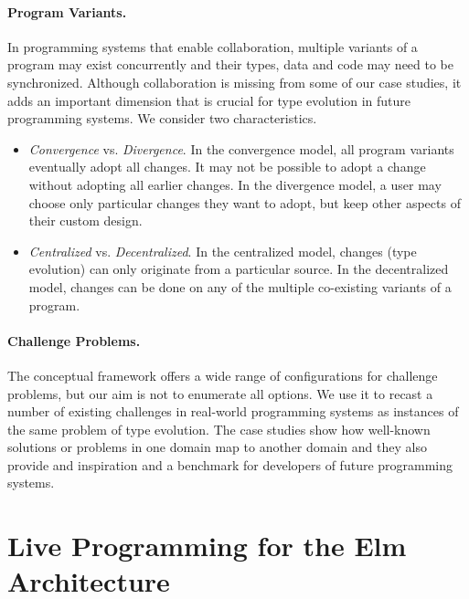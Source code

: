 \documentclass[english,submission]{programming}
\begin{document}
\paragraph{Program Variants.}
In programming systems that enable collaboration, multiple variants of a program may exist
concurrently and their types, data and code may need to be synchronized. Although collaboration
is missing from some of our case studies, it adds an important dimension that is crucial for
type evolution in future programming systems. We consider two characteristics.

\begin{itemize}
\item \emph{Convergence} vs. \emph{Divergence}. In the convergence model, all program variants
  eventually adopt all changes. It may not be possible to adopt a change without adopting
  all earlier changes. In the divergence model, a user may choose only
  particular changes they want to adopt, but keep other aspects of their custom design.
\item \emph{Centralized} vs. \emph{Decentralized}. In the centralized model, changes (type
  evolution) can only originate from a particular source. In the decentralized model,
  changes can be done on any of the multiple co-existing variants of a program.
\end{itemize}

\paragraph{Challenge Problems.}
The conceptual framework offers a wide range of configurations for challenge problems, but
our aim is not to enumerate all options. We use it to recast a number of
existing challenges in real-world programming systems as instances of the same problem of
type evolution. The case studies show how well-known solutions or problems in one domain
map to another domain and they also provide and inspiration and a benchmark for
developers of future programming systems.


\section{Live Programming for the Elm Architecture}
\label{sec:elm}
\end{document}
